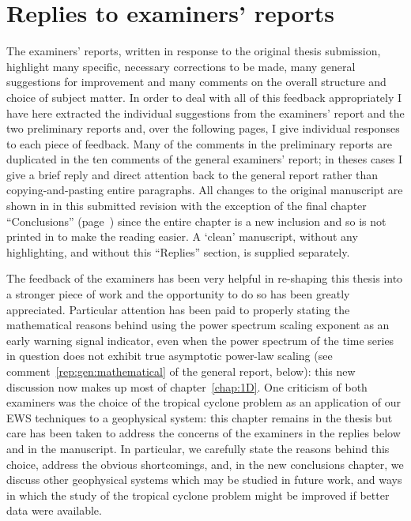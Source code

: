 
\chapter*{Replies to examiners' reports}

The examiners' reports, written in response to the original thesis submission, highlight many specific, necessary corrections to be made, many general suggestions for improvement and many comments on the overall structure and choice of subject matter. In order to deal with all of this feedback appropriately I have here extracted the individual suggestions from the examiners' report and the two preliminary reports and, over the following pages, I give individual responses to each piece of feedback. Many of the comments in the preliminary reports are duplicated in the ten comments of the general examiners' report; in theses cases I give a brief reply and direct attention back to the general report rather than copying-and-pasting entire paragraphs. All changes to the original manuscript are shown in {} in this submitted revision with the exception of the final chapter ``Conclusions'' (page~\pageref{chap:Conc}) since the entire chapter is a new inclusion and so is not printed in {} to make the reading easier. A `clean' manuscript, without any {} highlighting, and without this ``Replies'' section, is supplied separately. 

The feedback of the examiners has been very helpful in re-shaping this thesis into a stronger piece of work and the opportunity to do so has been greatly appreciated. Particular attention has been paid to properly stating the mathematical reasons behind using the power spectrum scaling exponent as an early warning signal indicator, even when the power spectrum of the time series in question does not exhibit true asymptotic power-law scaling (see comment~\ref{rep:gen:mathematical} of the general report, below): this new discussion now makes up most of chapter~\ref{chap:1D}. One criticism of both examiners was the choice of the tropical cyclone problem as an application of our EWS techniques to a geophysical system: this chapter remains in the thesis but care has been taken to address the concerns of the examiners in the replies below and in the manuscript. In particular, we carefully state the reasons behind this choice, address the obvious shortcomings, and, in the new conclusions chapter, we discuss other geophysical systems which may be studied in future work, and ways in which the study of the tropical cyclone problem might be improved if better data were available. 

